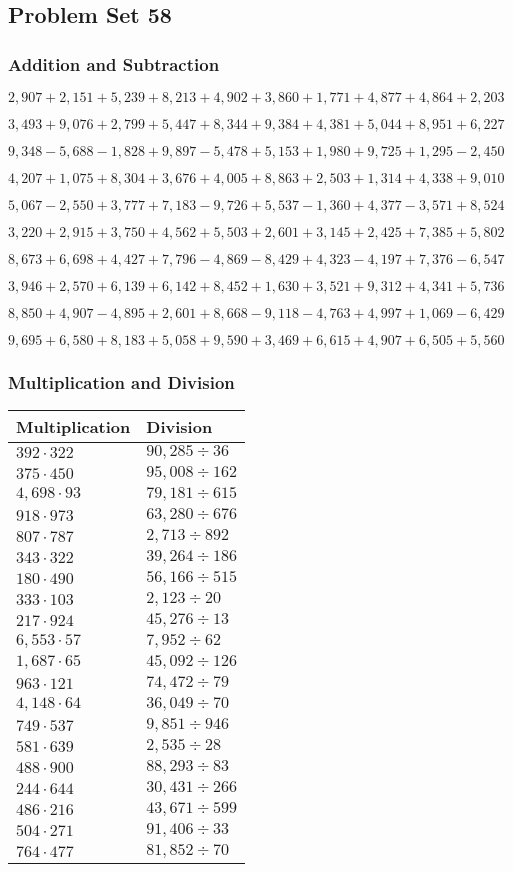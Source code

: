 \hypertarget{problem-set-58-2}{%
\subsection{Problem Set 58}\label{problem-set-58-2}}

\hypertarget{addition-and-subtraction-220}{%
\subsubsection{Addition and
Subtraction}\label{addition-and-subtraction-220}}

\(2,907+2,151+5,239+8,213+4,902+3,860+1,771+4,877+4,864+ 2,203\)

\(3,493+9,076+2,799+5,447+8,344+9,384+4,381+5,044+8,951+6,227\)

\(9,348-5,688-1,828+9,897-5,478+5,153+1,980+9,725+1,295-2,450\)

\(4,207+1,075+8,304+3,676+4,005+8,863+2,503+1,314+4,338+9,010\)

\(5,067-2,550+3,777+7,183-9,726+5,537-1,360+4,377-3,571+8,524\)

\(3,220+2,915+3,750+4,562+5,503+2,601+3,145+2,425+7,385+5,802\)

\(8,673+6,698+4,427+7,796-4,869-8,429+4,323-4,197+7,376-6,547\)

\(3,946+2,570+6,139+6,142+8,452+1,630+3,521+9,312+4,341+5,736\)

\(8,850+4,907-4,895+2,601+8,668-9,118-4,763+4,997+1,069-6,429\)

\(9,695+6,580+8,183+5,058+9,590+3,469+6,615+4,907+6,505+5,560\)

\hypertarget{multiplication-and-division-219}{%
\subsubsection{Multiplication and
Division}\label{multiplication-and-division-219}}

\begin{longtable}[]{@{}ll@{}}
\toprule
Multiplication & Division\tabularnewline
\midrule
\endhead
\(392\cdot322\) & \(90,285÷36\)\tabularnewline
\(375\cdot450\) & \(95,008÷162\)\tabularnewline
\(4,698\cdot93\) & \(79,181÷615\)\tabularnewline
\(918\cdot973\) & \(63,280÷676\)\tabularnewline
\(807\cdot787\) & \(2,713÷892\)\tabularnewline
\(343\cdot322\) & \(39,264÷186\)\tabularnewline
\(180\cdot490\) & \(56,166÷515\)\tabularnewline
\(333\cdot103\) & \(2,123÷20\)\tabularnewline
\(217\cdot924\) & \(45,276÷13\)\tabularnewline
\(6,553\cdot57\) & \(7,952÷62\)\tabularnewline
\(1,687\cdot65\) & \(45,092÷126\)\tabularnewline
\(963\cdot121\) & \(74,472÷79\)\tabularnewline
\(4,148\cdot64\) & \(36,049÷70\)\tabularnewline
\(749\cdot537\) & \(9,851÷946\)\tabularnewline
\(581\cdot639\) & \(2,535÷28\)\tabularnewline
\(488\cdot900\) & \(88,293÷83\)\tabularnewline
\(244\cdot644\) & \(30,431÷266\)\tabularnewline
\(486\cdot216\) & \(43,671÷599\)\tabularnewline
\(504\cdot271\) & \(91,406÷33\)\tabularnewline
\(764\cdot477\) & \(81,852÷70\)\tabularnewline
\bottomrule
\end{longtable}

